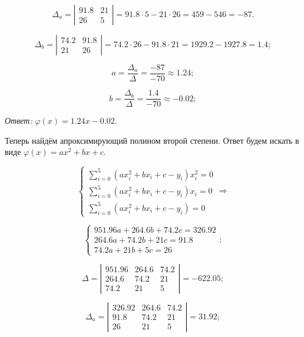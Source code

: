 \documentclass[a4paper, 12pt]{article}
\begin{document}
\begin{enumerate}
{    $$
    \Delta_a =
    \left |
      \begin{array}{cc}
        91.8 & 21 \\
        26 & 5
      \end{array}
    \right |
    = 91.8 \cdot 5 - 21 \cdot 26 = 459 - 546 = -87.
    $$

    $$
    \Delta_b =
    \left |
      \begin{array}{cc}
        74.2 & 91.8 \\
        21 & 26
      \end{array}
    \right |
    = 74.2 \cdot 26 - 91.8 \cdot 21 = 1929.2 - 1927.8 = 1.4;
    $$

    $$
    a = \dfrac {\Delta_a} {\Delta} = \dfrac {-87} {-70} \approx 1.24;
    $$

    $$
    b = \dfrac {\Delta_b} {\Delta} = \dfrac {1.4} {-70} \approx -0.02;
    $$

    \emph{Ответ:} $\varphi (x) = 1.24x - 0.02$.

    Теперь найдём апроксимирующий полином второй степени. Ответ будем искать в виде $\varphi (x) = ax^2 + bx +c$.

    $$
    \begin{cases}
      \sum \limits_{i = 0}^5 (ax_i^2+bx_i + c - y_i)x_i^2 = 0 \\
      \sum \limits_{i = 0}^5 (ax_i^2+bx_i + c - y_i)x_i = 0 \\
      \sum \limits_{i = 0}^5 (ax_i^2+bx_i + c - y_i) = 0 
    \end{cases}
    \Rightarrow
    $$

    $$
    \begin{cases}
      951.96a + 264.6b + 74.2c=326.92 \\
      264.6a + 74.2b + 21c =91.8 \\
      74.2a + 21 b + 5c =26
    \end{cases}
    ;
    $$

    $$
    \Delta =
    \left |
      \begin{array}{ccc}
        951.96 & 264.6 & 74.2 \\
        264.6 & 74.2 & 21 \\
        74.2 & 21 & 5
      \end{array}
    \right |
    = -622.05;
    $$

    $$
    \Delta_a =
    \left |
      \begin{array}{ccc}
        326.92 & 264.6 & 74.2 \\
        91.8 & 74.2 & 21 \\
        26 & 21 & 5
      \end{array}
    \right |
    = 31.92;
    $$

}
\end{enumerate}
\end{document}
